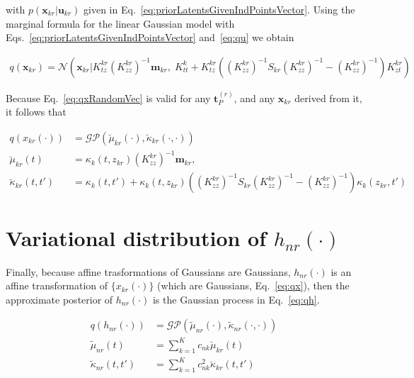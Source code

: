 \documentclass[12pt]{article}
\begin{document}
\noindent with $p(\mathbf{x}_{kr}|\mathbf{u}_{kr})$ given in
Eq.~\ref{eq:priorLatentsGivenIndPointsVector}. Using the marginal formula for
the linear Gaussian model \citep[][Eq.~2.115]{bishop06} with
Eqs.~\ref{eq:priorLatentsGivenIndPointsVector} and~\ref{eq:qu} we obtain

\begin{align}
    q(\mathbf{x}_{kr})=\mathcal{N}\left(\mathbf{x}_{kr}|K_{tz}^{kr}(K_{zz}^{kr})^{-1}\mathbf{m}_{kr},\;K_{tt}^k+K_{tz}^{kr}\left((K_{zz}^{kr})^{-1}S_{kr}(K_{zz}^{kr})^{-1}-(K_{zz}^{kr})^{-1  }\right)K_{zt}^{kr}\right)
    \label{eq:qxRandomVec}
\end{align}

Because Eq.~\ref{eq:qxRandomVec} is valid for any $\mathbf{t}_P^{(r)}$, and any
$\mathbf{x}_{kr}$ derived from it, it follows that


\begin{equation}
    \begin{aligned}
        q(x_{kr}(\cdot))&=\mathcal{GP}\left(\breve\mu_{kr}(\cdot),\breve\kappa_{kr}(\cdot,\cdot)\right)\\
        \breve\mu_{kr}(t)&=\kappa_k(t,z_{kr})(K_{zz}^{kr})^{-1}\mathbf{m}_{kr},\\
        \breve\kappa_{kr}(t,t')&=\kappa_k(t,t')+\kappa_k(t,z_{kr})\left((K_{zz}^{kr})^{-1}S_{kr}(K_{zz}^{kr})^{-1}-(K_{zz}^{kr})^{-1}\right)\kappa_k(z_{kr},t')
    \end{aligned}
    \label{eq:qx}
\end{equation}

\section{Variational distribution of $h_{nr}(\cdot)$}

Finally, because affine trasformations of Gaussians are Gaussians,
$h_{nr}(\cdot)$ is an affine transformation of $\{x_{kr}(\cdot)\}$ (which are
Gaussians, Eq.~\ref{eq:qx}), then the approximate posterior of $h_{nr}(\cdot)$
is the Gaussian process in Eq.~\ref{eq:qh}.

\begin{equation}
    \begin{aligned}
        q(h_{nr}(\cdot))&=\mathcal{GP}\left(\tilde\mu_{nr}(\cdot),\tilde\kappa_{nr}(\cdot,\cdot)\right)\\
        \tilde\mu_{nr}(t)&=\sum_{k=1}^Kc_{nk}\breve\mu_{kr}(t)\\
        \tilde\kappa_{nr}(t,t')&=\sum_{k=1}^Kc_{nk}^2\breve\kappa_{kr}(t,t')
    \end{aligned}
    \label{eq:qh}
\end{equation}
\end{document}
